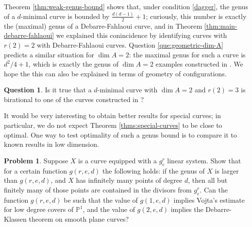 \documentclass[11pt]{amsart}
\newcommand{\PP}{\mathbb{P}}
\theoremstyle{definition}
\newtheorem{question}[theorem]{Question}
\newtheorem{problem}[theorem]{Problem}
\theoremstyle{remark}
\begin{document}
Theorem \ref{thm:weak-genus-bound} shows that, under condition \eqref{dagger}, the genus of a $d$-minimal curve is bounded by $\frac{d(d-1)}{2}+1$; curiously, this number is exactly the (maximal) genus of a Debarre-Fahlaoui curve, and in Theorem \ref{thm:main-debarre-fahlaoui} we explained this conincidence by identifying curves with $r(2)=2$ with Debarre-Fahlaoui curves. Question \ref{que:geometric-dim-A} predicts a similar situation for $\dim A =2$:  the maximal genus for such a curve is $d^2/4 +1$, which is exactly the genus of $\dim A = 2$ examples constructed in \cite{Debarre-Fahlaoui1993}. We hope the this can also be explained in terms of geometry of configurations. 
\begin{question}
Is it true that a $d$-minimal curve with $\dim A = 2$ and $r(2)=3$ is birational to one of the curves constructed in \cite{Debarre-Fahlaoui1993}?
\end{question}

It would be very interesting to obtain better results for special curves; in particular, we do not expect Theorem \ref{thms:special-curves} to be close to optimal. One way to test optimality of such a genus bound is to compare it to known results in low dimension.
\begin{problem}
Suppose $X$ is a curve equipped with a $g^r_e$ linear system. Show that for a certain function $g(r,e,d)$ the following holds: if the genus of $X$ is larger than $g(r,e,d)$, and $X$ has infinitely many points of degree $d$, then all but finitely many of those points are contained in the divisors from $g^r_e$. Can the function $g(r,e,d)$ be such that the value of $g(1,e,d)$ implies Vojta's estimate \cite{Vojta1992generalization} for low degree covers of $\PP^1$, and the value of $g(2,e,d)$ implies the Debarre-Klassen theorem \cite{Debarre-Klassen1994} on smooth plane curves?
\end{problem}


\end{document}

